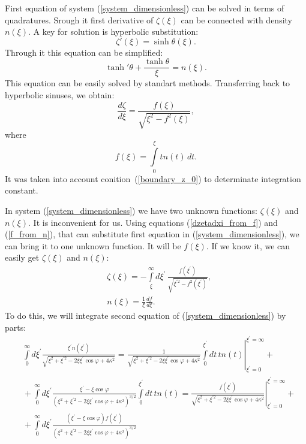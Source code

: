 \documentclass[10pt]{article}
\begin{document}
First equation of system (\ref{system_dimensionless}) can be solved in terms of quadratures.
Srough it first derivative of $\zeta(\xi)$ can be connected with density $n(\xi).$
A key for solution is hyperbolic substitution:
\begin{equation}
  \zeta'(\xi) = \sinh \theta (\xi).
\end{equation}
Through it this equation can be simplified:
\begin{equation}
  \tanh' \theta + \frac{\tanh \theta}{\xi} = n(\xi).
\end{equation}
This equation can be easily solved by standart methods.
Transferring back to hyperbolic sinuses, we obtain:
\begin{equation}
  \frac{d \zeta}{d \xi} = \frac{f(\xi)}{\sqrt{\xi^2 - f^2 (\xi)}},
  \label{dzetadxi_from_f}
\end{equation}
where 
\begin{equation}
  f(\xi) = \int\limits_0^\xi t n(t) \, dt.
  \label{f_from_n}
\end{equation}
It was taken into account conition~(\ref{boundary_z_0}) to determinate integration constant.

In system (\ref{system_dimensionless}) we have two unknown functions: $\zeta(\xi)$ and $n(\xi).$
It is inconvenient for us.
Using equations (\ref{dzetadxi_from_f}) and (\ref{f_from_n}), that can substitute first equation in (\ref{system_dimensionless}), we can bring it to one unknown function.
It will be $f(\xi).$
If we know it, we can easily get $\zeta(\xi)$ and $n(\xi)$:
\begin{eqnarray}
  &\zeta(\xi) = - \int\limits_\xi^\infty d\xi^{\prime} \, \frac{f(\xi^{\prime})}{\sqrt{\xi^{\prime 2} - f^2(\xi^{\prime})}}, \label{zeta_from_f}\\
  &n(\xi) = \frac{1}{\xi} \frac{df}{d\xi}. \label{n_from_f}
\end{eqnarray}
To do this, we will integrate second equation of (\ref{system_dimensionless}) by parts:
\begin{equation}
  \begin{aligned}
    &\int\limits_0^\infty d \xi^{\prime} \frac{\xi^{\prime} n(\xi^{\prime})}{ \sqrt{ \xi^2 + \xi^{\prime 2} - 2 \xi \xi^{\prime} \cos \varphi + 4 \kappa^2 } } = \left. \frac{1}{\sqrt{ \xi^2 + \xi^{\prime 2} - 2 \xi \xi^{\prime} \cos \varphi + 4 \kappa^2 }} \int\limits_0^{\xi^{\prime}} dt \, t n(t) \right|_{\xi^{\prime} = 0}^{\xi^{\prime} = \infty} + \\
    &{} + \int\limits_0^\infty d \xi^{\prime} \frac{\xi^{\prime} - \xi \cos \varphi}{ ( \xi^2 + \xi^{\prime 2} - 2 \xi \xi^{\prime} \cos \varphi + 4 \kappa^2 )^{3/2}} \int\limits_0^{\xi^{\prime}} dt \, t n(t) = \left. \frac{f(\xi^{\prime})}{\sqrt{ \xi^2 + \xi^{\prime 2} - 2 \xi \xi^{\prime} \cos \varphi + 4 \kappa^2 }} \right|_{\xi^{\prime} = 0}^{\xi^{\prime} = \infty} + \\
    &{} +  \int\limits_0^\infty d \xi^{\prime} \frac{(\xi^{\prime} - \xi \cos \varphi) f(\xi^{\prime})}{ ( \xi^2 + \xi^{\prime 2} - 2 \xi \xi^{\prime} \cos \varphi + 4 \kappa^2 )^{3/2}} 
  \end{aligned}
\end{equation}
\end{document}
